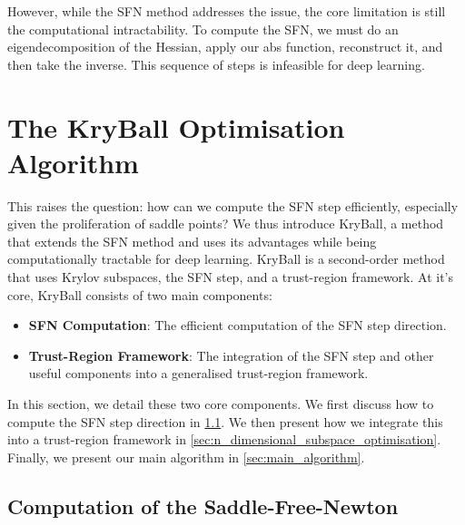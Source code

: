 However, while the SFN method addresses the issue, the core limitation is still the computational intractability. To compute the SFN, we must do an eigendecomposition of the Hessian, apply our abs function, reconstruct it, and then take the inverse. This sequence of steps is infeasible for deep learning.  

\section{The KryBall Optimisation Algorithm}
\label{sec:kryball_optimisation_algorithm}
This raises the question: how can we compute the SFN step efficiently, especially given the proliferation of saddle points? We thus introduce KryBall, a method that extends the SFN method and uses its advantages while being computationally tractable for deep learning. KryBall is a second-order method that uses Krylov subspaces, the SFN step, and a trust-region framework. At it's core, KryBall consists of two main components: 
\begin{itemize}
    \item \textbf{SFN Computation}: The efficient computation of the SFN step direction.
    \item \textbf{Trust-Region Framework}: The integration of the SFN step and other useful components into a generalised trust-region framework.
\end{itemize}
In this section, we detail these two core components. We first discuss how to compute the SFN step direction in \cref{sec:computation_of_the_saddle_free_newton}. We then present how we integrate this into a trust-region framework in \cref{sec:n_dimensional_subspace_optimisation}. Finally, we present our main algorithm in \cref{sec:main_algorithm}.

\subsection{Computation of the Saddle-Free-Newton}
\label{sec:computation_of_the_saddle_free_newton}

